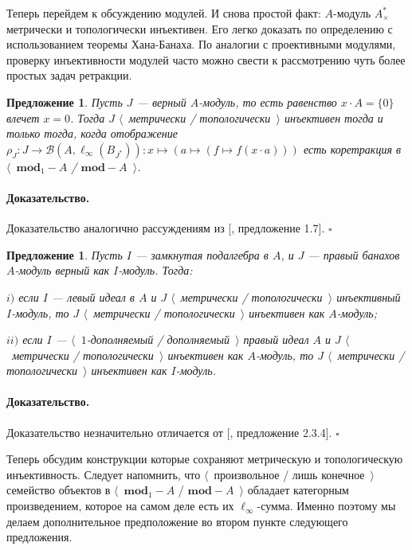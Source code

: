 \documentclass[12pt]{article}
\newtheorem{proposition}[theorem]{Предложение}
\renewenvironment{proof}{\paragraph{Доказательство.}}{\hfill$\square$\medskip}
\begin{document}
Теперь перейдем к обсуждению модулей. И снова простой факт: $A$-модуль $A_\times^*$ метрически и топологически инъективен. Его легко доказать по определению с использованием теоремы Хана-Банаха. По аналогии с проективными модулями, проверку инъективности модулей часто можно свести к рассмотрению чуть более простых задач ретракции. 

\begin{proposition}\label{NonDegenMetTopInjCharac}  Пусть $J$ --- верный $A$-модуль, то есть равенство $x\cdot A=\{0\}$ влечет $x=0$. Тогда $J$ $\langle$~метрически / топологически~$\rangle$ инъективен тогда и только тогда, когда отображение $\rho_J:J\to\mathcal{B}(A,\ell_\infty(B_{J^*})):x\mapsto(a\mapsto(f\mapsto f(x\cdot a)))$ есть коретракция в $\langle$~$\mathbf{mod}_1-A$ / $\mathbf{mod}-A$~$\rangle$.
\end{proposition} 
\begin{proof} Доказательство аналогично рассуждениям из [\cite{DalPolHomolPropGrAlg}, предложение 1.7].
\end{proof}

\begin{proposition}\label{MetTopInjUnderChangeOfAlg} Пусть $I$ --- замкнутая подалгебра в $A$, и $J$ --- правый банахов $A$-модуль верный как $I$-модуль. Тогда:

$i)$ если $I$ --- левый идеал в $A$ и $J$ $\langle$~метрически / топологически~$\rangle$ инъективный $I$-модуль, то $J$ $\langle$~метрически / топологически~$\rangle$ инъективен как $A$-модуль;

$ii)$ если $I$ --- $\langle$~$1$-дополняемый / дополняемый~$\rangle$ правый идеал $A$ и $J$ $\langle$~метрически / топологически~$\rangle$ инъективен как $A$-модуль, то $J$ $\langle$~метрически / топологически~$\rangle$ инъективен как $I$-модуль.
\end{proposition}
\begin{proof} Доказательство незначительно отличается от [\cite{RamsHomPropSemgroupAlg}, предложение 2.3.4].
\end{proof}

Теперь обсудим конструкции которые сохраняют метрическую и топологическую инъективность. Следует напомнить, что $\langle$~произвольное / лишь конечное~$\rangle$ семейство объектов в $\langle$~$\mathbf{mod}_1-A$ / $\mathbf{mod}-A$~$\rangle$ обладает категорным произведением, которое на самом деле есть их $\ell_\infty$-сумма. Именно поэтому мы делаем дополнительное предположение во втором пункте следующего предложения.
\end{document}
